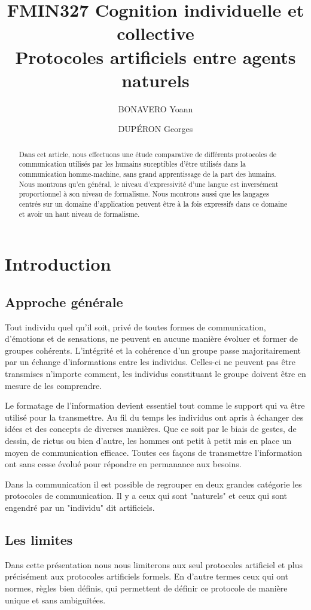 \documentclass[french,a4paper]{article}
\title{FMIN327 Cognition individuelle et collective\\Protocoles artificiels entre agents naturels}
\author{BONAVERO Yoann \and DUPÉRON Georges}
\begin{document}
\maketitle
\begin{abstract}
  Dans cet article, nous effectuons une étude comparative de
  différents protocoles de communication utilisés par les humains
  suceptibles d'être utilisés dans la communication homme-machine,
  sans grand apprentissage de la part des humains. Nous montrons qu'en
  général, le niveau d'expressivité d'une langue est inversément
  proportionnel à son niveau de formalisme. Nous montrons aussi que
  les langages centrés sur un domaine d'application peuvent être à la
  fois expressifs dans ce domaine et avoir un haut niveau de
  formalisme.
\end{abstract}
\tableofcontents
\newpage

\section{Introduction}
\subsection{Approche générale}
Tout individu quel qu'il soit, privé de toutes formes de communication, 
d'émotions et de sensations, ne peuvent en aucune manière évoluer et 
former de groupes cohérents. L'intégrité et la cohérence d'un groupe 
passe majoritairement par un échange d'informations entre les individus.
Celles-ci ne peuvent pas être transmises n'importe comment, les individus 
constituant le groupe doivent être en mesure de les comprendre. 

Le formatage de l'information devient essentiel tout comme le 
support qui va être utilisé pour la transmettre.
Au fil du temps les individus ont apris à échanger des idées et des 
concepts de diverses manières. Que ce soit par le biais de gestes, de 
dessin, de rictus ou bien d'autre, les hommes ont petit à petit mis en 
place un moyen de communication efficace. Toutes ces façons de 
transmettre l'information ont sans cesse évolué pour répondre en 
permanance aux besoins.

Dans la communication il est possible de regrouper en deux grandes 
catégorie les protocoles de communication. Il y a ceux qui sont 
"naturels" et ceux qui sont engendré par un "individu" dit artificiels.

\subsection{Les limites}
Dans cette présentation nous nous limiterons aux seul protocoles 
artificiel et plus précisément aux protocoles artificiels formels. En 
d'autre termes ceux qui ont normes, règles bien définis, qui permettent 
de définir ce protocole de manière unique et sans ambiguïtées.
\end{document}

